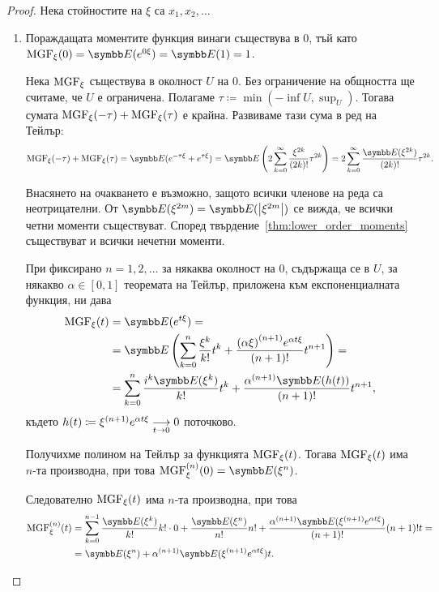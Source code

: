 \documentclass[numbers=endperiod, bibliography=totocnumbered]{scrartcl}
\begin{document}
\begin{proof}
  Нека стойностите на \( \xi \) са \( x_1, x_2, \ldots \)

  \mbox{}
  \begin{enumerate}
    \item Пораждащата моментите функция винаги съществува в \( 0 \), тъй като \( \MGF_\xi(0) = \Expect(e^{0\xi}) = \Expect(1) = 1 \).

    Нека \( \MGF_\xi \) съществува в околност \( U \) на \( 0 \). Без ограничение на общността ще считаме, че \( U \) е ограничена. Полагаме \( \tau \coloneqq \min(-\inf U, \sup_U) \). Тогава сумата \( \MGF_\xi(-\tau) + \MGF_\xi(\tau) \) е крайна. Развиваме тази сума в ред на Тейлър:
    \begin{equation*}
      \MGF_\xi(-\tau) + \MGF_\xi(\tau)
      =
      \Expect(e^{-\tau\xi} + e^{\tau\xi})
      =
      \Expect\left( 2 \sum_{k=0}^\infty \frac {\xi^{2k}} {(2k)!} \tau^{2k} \right)
      =
      2 \sum_{k=0}^\infty \frac {\Expect(\xi^{2k})} {(2k)!} \tau^{2k}.
    \end{equation*}

    Внасянето на очакването е възможно, защото всички членове на реда са неотрицателни. От \( \Expect(\xi^{2m}) = \Expect(\Abs{\xi^{2m}}) \) се вижда, че всички четни моменти съществуват. Според твърдение~\ref{thm:lower_order_moments} съществуват и всички нечетни моменти.

    При фиксирано \( n = 1, 2, \ldots \) за някаква околност на \( 0 \), съдържаща се в \( U \), за някакво \( \alpha \in [0, 1] \) теоремата на Тейлър, приложена към експоненциалната функция, ни дава
    \begin{align*}
      \MGF_\xi(t)
      &=
      \Expect(e^{t\xi})
      = \\ &=
      \Expect\left(\sum_{k=0}^n \frac {\xi^k} {k!} t^k + \frac {{(\alpha \xi)}^{(n+1)} e^{\alpha t \xi}} {(n+1)!} t^{n+1} \right)
      = \\ &=
      \sum_{k=0}^n \frac {i^k \Expect(\xi^k)} {k!} t^k + \frac {{\alpha}^{(n+1)} \Expect(h(t))} {(n+1)!} t^{n+1},
    \end{align*}
    където \( h(t) \coloneqq \xi^{(n+1)} e^{\alpha t \xi} \Conv[t \to 0]{} 0 \) поточково.

    Получихме полином на Тейлър за функцията \( \MGF_\xi(t) \). Тогава \( \MGF_\xi(t) \) има \( n \)-та производна, при това \( \MGF^{(n)}_\xi(0) = \Expect(\xi^n) \).

    Следователно \( \MGF_\xi(t) \) има \( n \)-та производна, при това
    \begin{align*}
      \MGF^{(n)}_\xi(t)
      &=
      \sum_{k=0}^{n-1} \frac {\Expect(\xi^k)} {k!} k! \cdot 0 + \frac {\Expect(\xi^n)} {n!} n! + \frac {\alpha^{(n+1)} \Expect(\xi^{(n+1)} e^{\alpha t \xi})} {(n+1)!} (n+1)! t
      = \\ &=
      \Expect(\xi^n) + \alpha^{(n+1)} \Expect(\xi^{(n+1)} e^{\alpha t \xi}) t.
    \end{align*}


\end{enumerate}
\end{proof}
\end{document}
